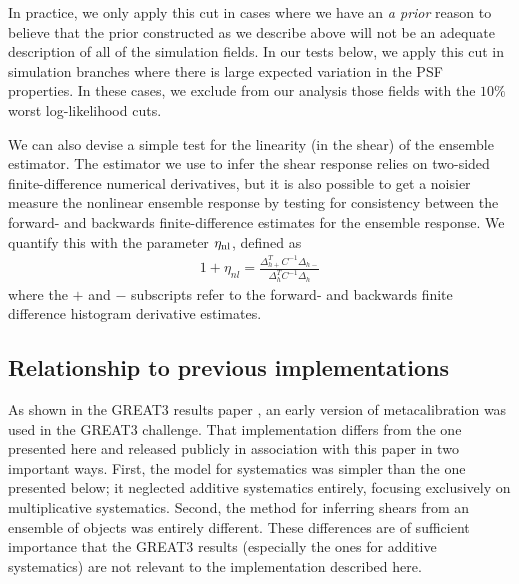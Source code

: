 \documentclass[iop]{emulateapj}
\newcommand\rmcomment[1]{\textcolor{red}{(RM: #1)}}
\begin{document}
In practice, we only apply this cut in cases where we have an {\it a
  prior} reason to believe that the prior constructed as we describe
above will not be an adequate description of all of the simulation
fields. In our tests below, we apply this cut in simulation branches
where there is large expected variation in the PSF properties. In
these cases, we exclude from our analysis those fields with the $10\%$
worst log-likelihood cuts.



We can also devise a simple test for the linearity (in the shear) of
the ensemble estimator. The estimator we use to infer the shear
response relies on two-sided finite-difference numerical derivatives,
but it is also possible to get a noisier measure the nonlinear
ensemble response by testing for consistency between the forward- and
backwards finite-difference estimates for the ensemble response. We
quantify this with the parameter $\eta_{\rm nl}$, defined as
\begin{align}
1+\eta_{nl} = \frac{\Delta_{h+}^T C^{-1} \Delta_{h-}}{\Delta_{h}^TC^{-1}\Delta_{h}}
\end{align}
where the $+$ and $-$ subscripts refer to the forward- and backwards
finite difference histogram derivative estimates.

\subsection{Relationship to previous implementations}

As shown in the GREAT3 results paper \citep{2015MNRAS.450.2963M}, an
early version of metacalibration was used in the GREAT3 challenge.
That implementation differs from the one presented here and released
publicly in association with this paper in two important ways.  First,
the model for systematics was simpler than the one presented below; it
neglected additive systematics entirely, focusing exclusively on
multiplicative systematics. Second, the method for inferring shears
from an ensemble of objects was entirely different.  These differences
are of sufficient importance that the GREAT3 results (especially the
ones for additive systematics) are not relevant to the implementation
described here.
\end{document}
